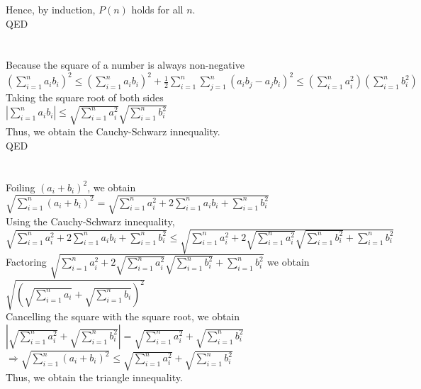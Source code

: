 \documentclass[10pt]{article}
\begin{document}
\begin{enumerate}[label=\bfseries Problem \arabic*:]
    Hence, by induction, $P(n)$ holds for all $n$.\\
    QED
    \\
    \\
    \\
    Because the square of a number is always non-negative\\
    $(\displaystyle{\sum_{i=1}^{n}}a_ib_i)^2\le (\displaystyle{\sum_{i=1}^{n}}a_ib_i)^2+\frac{1}{2}\displaystyle{\sum_{i=1}^{n}}\displaystyle{\sum_{j=1}^{n}}(a_ib_j-a_jb_i)^2\le (\displaystyle{\sum_{i=1}^{n}}a_{i}^2)(\displaystyle{\sum_{i=1}^{n}}b_{i}^2)$\\
    Taking the square root of both sides\\
    $|\displaystyle{\sum_{i=1}^{n}}a_ib_i|\le \sqrt{\displaystyle{\sum_{i=1}^{n}}a_{i}^2}\sqrt{\displaystyle{\sum_{i=1}^{n}}b_{i}^2}$\\
    Thus, we obtain the Cauchy-Schwarz innequality.\\
    QED
    \\
    \\
    \\
    Foiling $(a_i+b_i)^2$, we obtain $\sqrt{\displaystyle{\sum_{i=1}^{n}}(a_i+b_i)^2}=\sqrt{\displaystyle{\sum_{i=1}^{n}}a_i^2+2\displaystyle{\sum_{i=1}^{n}}a_ib_i+\displaystyle{\sum_{i=1}^{n}}b_i^2}$\\
    Using the Cauchy-Schwarz innequality, $\sqrt{\displaystyle{\sum_{i=1}^{n}}a_i^2+2\displaystyle{\sum_{i=1}^{n}}a_ib_i+\displaystyle{\sum_{i=1}^{n}}b_i^2}\le \sqrt{\displaystyle{\sum_{i=1}^{n}}a_i^2+2\sqrt{\displaystyle{\sum_{i=1}^{n}}a_{i}^2}\sqrt{\displaystyle{\sum_{i=1}^{n}}b_{i}^2}+\displaystyle{\sum_{i=1}^{n}}b_i^2}$\\
    Factoring $\sqrt{\displaystyle{\sum_{i=1}^{n}}a_i^2+2\sqrt{\displaystyle{\sum_{i=1}^{n}}a_{i}^2}\sqrt{\displaystyle{\sum_{i=1}^{n}}b_{i}^2}+\displaystyle{\sum_{i=1}^{n}}b_i^2}$ we obtain $\sqrt{(\sqrt{\displaystyle{\sum_{i=1}^{n}}a_i}+\sqrt{\displaystyle{\sum_{i=1}^{n}}b_i})^2}$\\
    Cancelling the square with the square root, we obtain $|\sqrt{\displaystyle{\sum_{i=1}^{n}}a_{i}^{2}}+\sqrt{\displaystyle{\sum_{i=1}^{n}}b_{i}^{2}}|=\sqrt{\displaystyle{\sum_{i=1}^{n}}a_{i}^{2}}+\sqrt{\displaystyle{\sum_{i=1}^{n}}b_{i}^{2}}$\\
    $\Rightarrow\sqrt{\displaystyle{\sum_{i=1}^{n}}(a_i+b_i)^2}\le\sqrt{\displaystyle{\sum_{i=1}^{n}}a_{i}^2}+\sqrt{\displaystyle{\sum_{i=1}^{n}} b_{i}^{2}}$\\
    Thus, we obtain the triangle innequality.\\

\end{enumerate}
\end{document}
